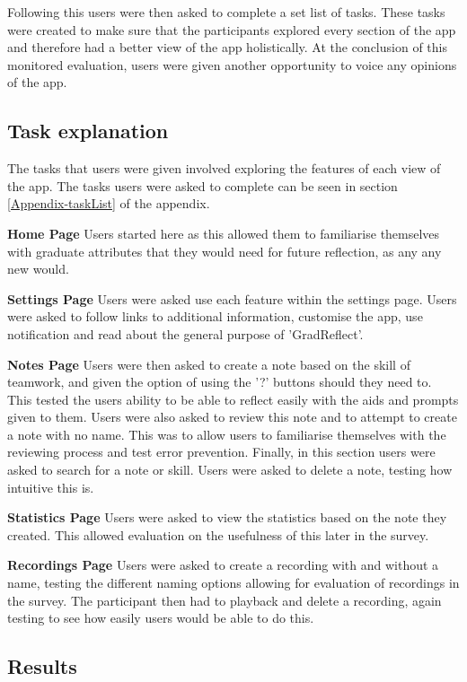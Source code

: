 \documentclass{l4proj}
\begin{document}
Following this users were then asked to complete a set list of tasks. These tasks were created to make sure that the participants explored every section of the app and therefore had a better view of the app holistically. At the conclusion of this monitored evaluation, users were given another opportunity to voice any opinions of the app.

\subsection{Task explanation}

The tasks that users were given involved exploring the features of each view of the app. The tasks users were asked to complete can be seen in section \ref{Appendix-taskList} of the appendix.

\textbf{Home Page} Users started here as this allowed them to familiarise themselves with graduate attributes that they would need for future reflection, as any any new would. 
 
\textbf{Settings Page} Users were asked use each feature within the settings page. Users were asked to follow links to additional information, customise the app, use notification and read about the general purpose of 'GradReflect'.

\textbf{Notes Page} Users were then asked to create a note based on the skill of teamwork, and given the option of using the '?' buttons should they need to. This tested the users ability to be able to reflect easily with the aids and prompts given to them. Users were also asked to review this note and to attempt to create a note with no name. This was to allow users to familiarise themselves with the reviewing process and test error prevention. Finally, in this section users were asked to search for a note or skill. Users were asked to delete a note, testing how intuitive this is.
 
\textbf{Statistics Page} Users were asked to view the statistics based on the note they created. This allowed evaluation on the usefulness of this later in the survey. 

\textbf{Recordings Page} Users were asked to create a recording with and without a name, testing the different naming options allowing for evaluation of recordings in the survey. The participant then had to playback and delete a recording, again testing to see how easily users would be able to do this.


\subsection{Results}
\end{document}
